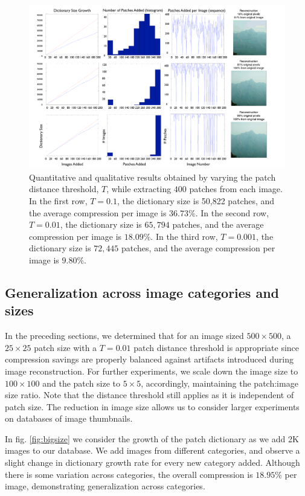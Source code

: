  \begin{figure}
\includegraphics[width=1\linewidth]{Figures/perfGraphs_25_big.pdf}
\caption{Quantitative and qualitative results obtained by varying the patch distance threshold, $T$, while extracting $400$ patches from each image. In the first row, $T=0.1$, the dictionary size is 50,822 patches, and the average compression per image is $36.73\%$. In the second row, $T=0.01$, the dictionary size is $65,794$ patches, and the average compression per image is $18.09\%$. In the third row, $T=0.001$, the dictionary size is $72,445$ patches, and the average compression per image is $9.80\%$.}
\label{fig:perfGraphs}
\end{figure}

\subsection{Generalization across image categories and sizes}
\label{sec:growing_db}

In the preceding sections, we determined that for an image sized $500\times 500$, a $25\times 25$ patch size with a $T=0.01$ patch distance threshold is appropriate since compression savings are properly balanced against artifacts introduced during image reconstruction. For further experiments, we scale down the image size to $100\times 100$ and the patch size to $5\times 5$, accordingly, maintaining the patch:image size ratio. Note that the distance threshold still applies as it is independent of patch size. The reduction in image size allows us to consider larger experiments on databases of image thumbnails.

In fig. \ref{fig:bigsize} we consider the growth of the patch dictionary as we add 2K images to our database. We add images from different categories, and observe a slight change in dictionary growth rate for every new category added. Although there is some variation across categories, the overall compression is $18.95\%$ per image, demonstrating generalization across categories.

